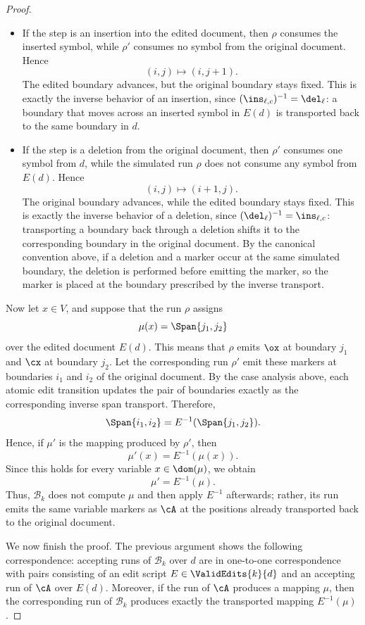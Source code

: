 \begin{proof}
\begin{itemize}
		\item If the step is an insertion into the edited document, then $\rho$ consumes the inserted symbol, while $\rho'$ consumes no symbol from the original document. Hence
		\[
		(i,j)\mapsto(i,j+1).
		\]
		The edited boundary advances, but the original boundary stays fixed. This is exactly the inverse behavior of an insertion, since $(\ins_{\ell,c})^{-1}=\del_{\ell}$: a boundary that moves across an inserted symbol in $E(d)$ is transported back to the same boundary in $d$.
		
		\item If the step is a deletion from the original document, then $\rho'$ consumes one symbol from $d$, while the simulated run $\rho$ does not consume any symbol from $E(d)$. Hence
		\[
		(i,j)\mapsto(i+1,j).
		\]
		The original boundary advances, while the edited boundary stays fixed. This is exactly the inverse behavior of a deletion, since $(\del_{\ell})^{-1}=\ins_{\ell,c}$: transporting a boundary back through a deletion shifts it to the corresponding boundary in the original document. By the canonical convention above, if a deletion and a marker occur at the same simulated boundary, the deletion is performed before emitting the marker, so the marker is placed at the boundary prescribed by the inverse transport.
		
	\end{itemize}
	
	\noindent Now let $x\in V$, and suppose that the run $\rho$ assigns
	\[
	\mu(x)=\Span{j_1,j_2}
	\]
	over the edited document $E(d)$. This means that $\rho$ emits $\ox$ at boundary $j_1$ and $\cx$ at boundary $j_2$. Let the corresponding run $\rho'$ emit these markers at boundaries $i_1$ and $i_2$ of the original document. By the case analysis above, each atomic edit transition updates the pair of boundaries exactly as the corresponding inverse span transport. Therefore,
	\[
	\Span{i_1,i_2}
	=
	E^{-1}(\Span{j_1,j_2}).
	\]
	Hence, if $\mu'$ is the mapping produced by $\rho'$, then
	\[
	\mu'(x)=E^{-1}(\mu(x)).
	\]
	Since this holds for every variable $x\in\dom(\mu)$, we obtain
	\[
	\mu'=E^{-1}(\mu).
	\]
	Thus, $\mathcal{B}_k$ does not compute $\mu$ and then apply $E^{-1}$ afterwards; rather, its run emits the same variable markers as $\cA$ at the positions already transported back to the original document.
	
	We now finish the proof. The previous argument shows the following correspondence: accepting runs of $\mathcal{B}_k$ over $d$ are in one-to-one correspondence with pairs consisting of an edit script $E\in\ValidEdits{k}{d}$ and an accepting run of $\cA$ over $E(d)$. Moreover, if the run of $\cA$ produces a mapping $\mu$, then the corresponding run of $\mathcal{B}_k$ produces exactly the transported mapping $E^{-1}(\mu)$.
	

\end{proof}
